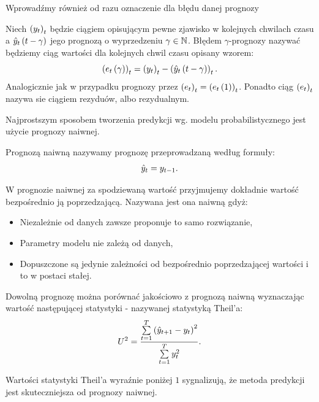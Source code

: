 \documentclass[10pt,a4paper]{book}
\begin{document}
Wprowadźmy również od razu oznaczenie dla błędu danej prognozy

\begin{definition}
Niech $\left( {y_t} \right)_{t}^{} $ będzie ciągiem opisującym pewne zjawisko w kolejnych chwilach czasu a $\predict[t-\gamma]{y}{t}$ jego prognozą o wyprzedzeniu $\gamma \in \mathbb{N}$. Błędem $\gamma$-prognozy nazywać będziemy ciąg wartości dla kolejnych chwil czasu opisany wzorem:
$$
\sequence{\function{e_t}{\gamma}}{t}{} = \sequence{y_t}{t}{} - \sequence{\predict[t-\gamma]{y}{t}}{t}{}.
$$
Analogicznie jak w przypadku prognozy przez $\left( {e_t} \right)_{t}^{} = \left( {{{e_t}\left( {1} \right)} } \right)_{t}^{} $. Ponadto ciąg $\left( {e_t} \right)_{t}^{} $ nazywa sie ciągiem rezyduów, albo rezydualnym.
\end{definition}

Najprostszym sposobem tworzenia predykcji wg. modelu probabilistycznego jest użycie prognozy naiwnej.

\begin{definition}
Prognozą naiwną nazywamy prognozę przeprowadzaną według formuły:
$$
\predict{y}{t} = y_{t-1}.
$$
\end{definition}


W prognozie naiwnej za spodziewaną wartość przyjmujemy dokładnie wartość bezpośrednio ją poprzedzającą. Nazywana jest ona naiwną gdyż:
\begin{itemize}
\item Niezależnie od danych zawsze proponuje to samo rozwiązanie,
\item Parametry modelu nie zależą od danych,
\item Dopuszczone są jedynie zależności od bezpośrednio poprzedzającej wartości i to w postaci stałej.
\end{itemize}

\begin{definition}
Dowolną prognozę można porównać jakościowo z prognozą naiwną wyznaczając wartość następującej statystyki - nazywanej statystyką Theil'a:
$$
U^2 = \frac{\sum_{t = 1}^{T} \bracket{\predict{y}{t+1} - y_t }^2}{\sum_{t=1}^{T} y_t^2}.
$$
\end{definition}
Wartości statystyki Theil'a wyraźnie poniżej $1$ sygnalizują, że metoda predykcji jest skuteczniejsza od prognozy naiwnej.
\end{document}
